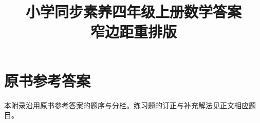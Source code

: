 \documentclass{ctexbook}
\title{小学同步素养四年级上册数学答案\\[.4em]\large 窄边距重排版}
\author{}
\date{}
\begin{document}
\frontmatter
\maketitle
\tableofcontents
\mainmatter

\appendix
\chapter{原书参考答案}
本附录沿用原书参考答案的题序与分栏。练习题的订正与补充解法见正文相应题目。
\clearpage

\end{document}
